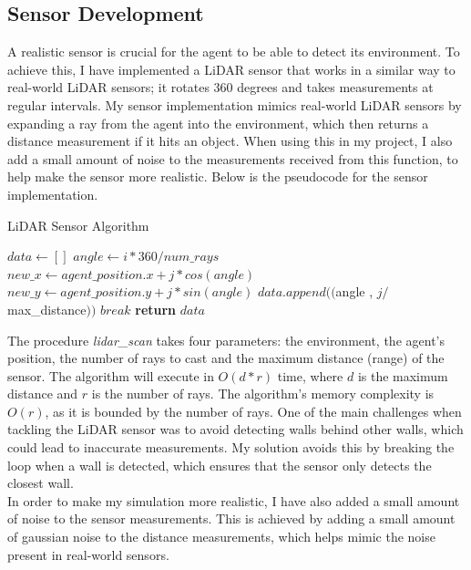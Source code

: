 \documentclass[12pt]{article}
\begin{document}
\subsection{Sensor Development}
A realistic sensor is crucial for the agent to be able to detect its environment. To achieve this, I have implemented a LiDAR sensor
that works in a similar way to real-world LiDAR sensors; it rotates 360 degrees and takes measurements at regular intervals. My sensor
implementation mimics real-world LiDAR sensors by expanding a ray from the agent into the environment, which then returns a distance
measurement if it hits an object. When using this in my project, I also add a small amount of noise to the measurements received from
this function, to help make the sensor more realistic. Below is the pseudocode for the sensor implementation.\\
\begin{algorithm}[H]
    \caption{LiDAR Sensor Algorithm}\label{alg:lidar_sensor}
    \begin{algorithmic}
            \State $data \gets []$
                \State $angle \gets i * 360 / num\_rays$
                    \State $new\_x \gets agent\_position.x + j * cos(angle)$
                    \State $new\_y \gets agent\_position.y + j * sin(angle)$
                        \State $data.append(($angle , $j / $max\_distance$))$
                        \State $break$
                    \EndIf
                \EndFor
            \EndFor
            \State \textbf{return} $data$
        \EndFunction{}
    \end{algorithmic}
\end{algorithm}
The procedure \textit{lidar\_scan} takes four parameters: the environment, the agent's position, the number of rays to cast and the
maximum distance (range) of the sensor. The algorithm will execute in \(O(d * r)\) time, where \(d\) is the maximum distance and \(r\) is
the number of rays. The algorithm's memory complexity is \(O(r)\), as it is bounded by the number of rays. One of the main challenges when
tackling the LiDAR sensor was to avoid detecting walls behind other walls, which could lead to inaccurate measurements. My solution avoids
this by breaking the loop when a wall is detected, which ensures that the sensor only detects the closest wall.\\
In order to make my simulation more realistic, I have also added a small amount of noise to the sensor measurements. This is achieved by
adding a small amount of gaussian noise to the distance measurements, which helps mimic the noise present in real-world sensors.\\
\end{document}
